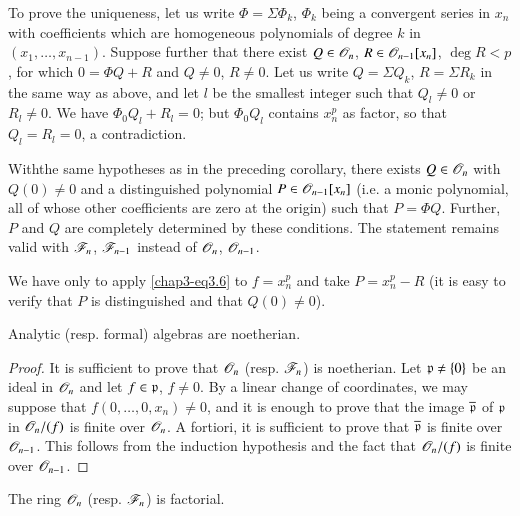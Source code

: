 To prove the uniqueness, let us write $\Phi=\Sigma \Phi_{k}$, $\Phi_{k}$ being a convergent series in $x_{n}$ with coefficients which are homogeneous polynomials of degree $k$ in $(x_{1},\ldots,x_{n-1})$. Suppose further that there exist $Q\in \mathscr{O}_{n}$, $R\in \mathscr{O}_{n-1}[x_{n}]$, $\deg R<p$, for which $0=\Phi Q+R$ and $Q\neq 0$, $R\neq 0$. Let us write $Q=\Sigma Q_{k}$, $R=\Sigma R_{k}$ in the same way as above, and let $l$ be the smallest integer such that $Q_{l}\neq 0$ or $R_{l}\neq 0$. We have $\Phi_{0}Q_{l}+R_{l}=0$; but $\Phi_{0}Q_{l}$ contains $x^{p}_{n}$ as factor, so that $Q_{l}=R_{l}=0$, a contradiction.

\begin{corollary}[Weierstrass]\label{chap3-coro3.7}
With\pageoriginale the same hypotheses as in the preceding corollary, there exists $Q\in \mathscr{O}_{n}$ with $Q(0)\neq 0$ and a distinguished polynomial $P\in \mathscr{O}_{n-1}[x_{n}]$ (i.e. a monic polynomial, all of whose other coefficients are zero at the origin) such that $P=\Phi Q$. Further, $P$ and $Q$ are completely determined by these conditions. The statement remains valid with $\mathscr{F}_{n}$, $\mathscr{F}_{n-1}$ instead of $\mathscr{O}_{n}$, $\mathscr{O}_{n-1}$.
\end{corollary}

We have only to apply \eqref{chap3-eq3.6} to $f=x^{p}_{n}$ and take $P=x^{p}_{n}-R$ (it is easy to verify that $P$ is distinguished and that $Q(0)\neq 0$).

\begin{theorem}\label{chap3-thm3.8}
Analytic (resp. formal) algebras are noetherian.
\end{theorem}

\begin{proof}
It is sufficient to prove that $\mathscr{O}_{n}$ (resp. $\mathscr{F}_{n}$) is noetherian. Let $\mathfrak{p}\neq \{0\}$ be an ideal in $\mathscr{O}_{n}$ and let $f\in \mathfrak{p}$, $f\neq 0$. By a linear change of coordinates, we may suppose that $f(0,\ldots,0,x_{n})\neq 0$, and it is enough to prove that the image $\overline{\mathfrak{p}}$ of $\mathfrak{p}$ in $\mathscr{O}_{n}/(f)$ is finite over $\mathscr{O}_{n}$. A fortiori, it is sufficient to prove that $\overline{\mathfrak{p}}$ is finite over $\mathscr{O}_{n-1}$. This follows from the induction hypothesis and the fact that $\mathscr{O}_{n}/(f)$ is finite over $\mathscr{O}_{n-1}$.
\end{proof}

\begin{theorem}\label{chap3-thm3.9}
The ring $\mathscr{O}_{n}$ (resp. $\mathscr{F}_{n}$) is factorial.
\end{theorem}

